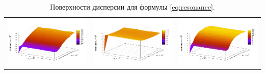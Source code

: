\documentclass[12pt,a4paper]{article}
\theoremstyle{definition}
\begin{document}
\begin{table}[h]
\begin{tabular}{c c c}
	\includegraphics[scale=0.4]{figs/resonance/p1.txt_coeff2.dat.pdf} & \includegraphics[scale=0.4]{figs/resonance/p2.txt_coeff2.dat.pdf} & \includegraphics[scale=0.4]{figs/resonance/p3.txt_coeff2.dat.pdf}
  \end{tabular}
  \caption{Поверхности дисперсии для формулы \eqref{eq:resonance}.}
  \label{tabl:res_resonance}
\end{table}
\end{document}
